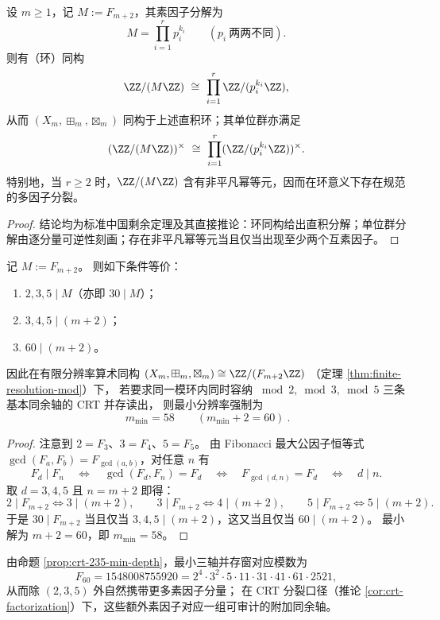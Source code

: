 \begin{corollary}\label{cor:crt-factorization}
设 $m\ge 1$，记 $M:=F_{m+2}$，其素因子分解为
\[
M=\prod_{i=1}^{r} p_i^{k_i}\qquad(p_i\ \text{两两不同}).
\]
则有（环）同构
\[
\ZZ/(M\ZZ)\ \cong\ \prod_{i=1}^{r}\ZZ/(p_i^{k_i}\ZZ),
\]
从而 $(X_m,\boxplus_m,\boxtimes_m)$ 同构于上述直积环；其单位群亦满足
\[
(\ZZ/(M\ZZ))^\times\ \cong\ \prod_{i=1}^{r}(\ZZ/(p_i^{k_i}\ZZ))^\times.
\]
特别地，当 $r\ge 2$ 时，$\ZZ/(M\ZZ)$ 含有非平凡幂等元，因而在环意义下存在规范的多因子分裂。
\end{corollary}
\begin{proof}
结论均为标准中国剩余定理及其直接推论：环同构给出直积分解；单位群分解由逐分量可逆性刻画；存在非平凡幂等元当且仅当出现至少两个互素因子。
\end{proof}

\begin{proposition}[2/3/5 三轴并存的最小模深度]\label{prop:crt-235-min-depth}
记 \(M:=F_{m+2}\)。
则如下条件等价：
\begin{enumerate}
  \item \(2,3,5\mid M\)（亦即 \(30\mid M\)）；
  \item \(3,4,5\mid (m+2)\)；
  \item \(60\mid (m+2)\)。
\end{enumerate}
因此在有限分辨率算术同构
\((X_m,\boxplus_m,\boxtimes_m)\cong \ZZ/(F_{m+2}\ZZ)\)
（定理 \ref{thm:finite-resolution-mod}）下，
若要求同一模环内同时容纳 \(\bmod 2,\bmod 3,\bmod 5\) 三条基本同余轴的 CRT 并存读出，
则最小分辨率强制为
\[
\boxed{\ m_{\min}=58\qquad(m_{\min}+2=60)\ }.
\]
\end{proposition}
\begin{proof}
注意到 \(2=F_3\)、\(3=F_4\)、\(5=F_5\)。
由 Fibonacci 最大公因子恒等式
\(\gcd(F_a,F_b)=F_{\gcd(a,b)}\)，对任意 \(n\) 有
\[
F_d\mid F_n\quad\Longleftrightarrow\quad \gcd(F_d,F_n)=F_d
\quad\Longleftrightarrow\quad
F_{\gcd(d,n)}=F_d
\quad\Longleftrightarrow\quad
d\mid n.
\]
取 \(d=3,4,5\) 且 \(n=m+2\) 即得：
\[
2\mid F_{m+2}\Longleftrightarrow 3\mid(m+2),\qquad
3\mid F_{m+2}\Longleftrightarrow 4\mid(m+2),\qquad
5\mid F_{m+2}\Longleftrightarrow 5\mid(m+2).
\]
于是 \(30\mid F_{m+2}\) 当且仅当 \(3,4,5\mid(m+2)\)，这又当且仅当 \(60\mid(m+2)\)。
最小解为 \(m+2=60\)，即 \(m_{\min}=58\)。
\end{proof}

\begin{remark}[\texorpdfstring{$m=58$}{m=58} 的三轴 CRT 模数与素因子丰富性]\label{rem:crt-235-m58-factorization}
由命题 \ref{prop:crt-235-min-depth}，最小三轴并存窗对应模数为
\[
F_{60}=1548008755920
=2^4\cdot 3^2\cdot 5\cdot 11\cdot 31\cdot 41\cdot 61\cdot 2521,
\]
从而除 \((2,3,5)\) 外自然携带更多素因子分量；
在 CRT 分裂口径（推论 \ref{cor:crt-factorization}）下，这些额外素因子对应一组可审计的附加同余轴。
\end{remark}

